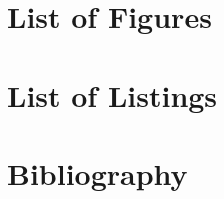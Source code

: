 \let\origcleardoublepage\cleardoublepage



\chapter{List of Figures}
\renewcommand{\listfigurename}{}
\let\origcleardoublepage\cleardoublepage
\let\cleardoublepage\null
\vspace{-2.6cm}
\listoffigures
\let\cleardoublepage\origcleardoublepage




\chapter{List of Listings}
\let\origcleardoublepage\cleardoublepage
\let\cleardoublepage\null
\vspace{-2.6cm}
\listoflistingenv
\let\cleardoublepage\origcleardoublepage

\chapter{Bibliography}

\let\cleardoublepage\null
\vspace{-2.6cm}
\printbibliography[title={\ }]
\let\cleardoublepage\origcleardoublepage